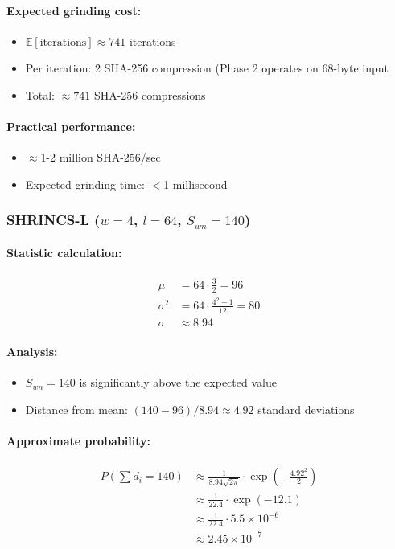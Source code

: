 \paragraph{Expected grinding cost:}
\begin{itemize}
    \item $\mathbb{E}[\text{iterations}] \approx 741$ iterations
    \item Per iteration: 2 SHA-256 compression (Phase 2 operates on 68-byte input
    \item Total: $\approx 741$ SHA-256 compressions
\end{itemize}

\paragraph{Practical performance:}
\begin{itemize}
    \item $\approx$1-2 million SHA-256/sec
    \item Expected grinding time: $<$1 millisecond
\end{itemize}

\subsubsection{SHRINCS-L ($w=4$, $l=64$, $S_{wn}=140$)}

\paragraph{Statistic calculation:}
\begin{align}
    \mu &= 64 \cdot \frac{3}{2} = 96 \\
    \sigma^2 &= 64 \cdot \frac{4^2-1}{12} = 80 \\
    \sigma &\approx 8.94
\end{align}

\paragraph{Analysis:}
\begin{itemize}
    \item $S_{wn} = 140$ is significantly above the expected value
    \item Distance from mean: $(140 - 96)/8.94 \approx 4.92$ standard deviations
\end{itemize}

\paragraph{Approximate probability:}
\begin{align}
    P(\sum d_i = 140) &\approx \frac{1}{8.94\sqrt{2\pi}} \cdot \exp\left(-\frac{4.92^2}{2}\right) \nonumber \\
    &\approx \frac{1}{22.4} \cdot \exp(-12.1) \nonumber \\
    &\approx \frac{1}{22.4} \cdot 5.5 \times 10^{-6} \nonumber \\
    &\approx 2.45 \times 10^{-7}
\end{align}

